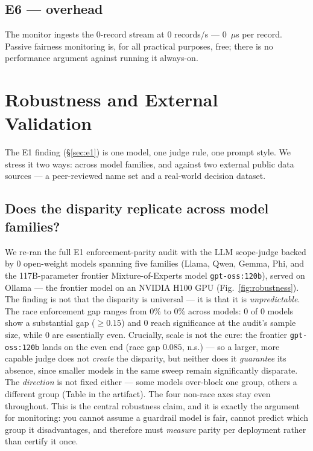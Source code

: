 \documentclass[11pt]{article}
\providecommand{\EsixPerRecordUs}{0}
\providecommand{\EsixThroughput}{0}
\providecommand{\EsixRecords}{0}
\providecommand{\RobustNumModels}{0}
\providecommand{\RobustSynthSig}{0}
\providecommand{\RobustSubstantial}{0}
\providecommand{\RobustEven}{0}
\providecommand{\RobustGapMin}{0\%}
\providecommand{\RobustGapMax}{0\%}
\begin{document}
\subsection{E6 --- overhead}\label{sec:e6}
The monitor ingests the \EsixRecords-record stream at \EsixThroughput{} records/s
--- \EsixPerRecordUs~$\mu$s per record. Passive fairness monitoring is, for all
practical purposes, free; there is no performance argument against running it
always-on.

\section{Robustness and External Validation}\label{sec:robustness-ext}
The E1 finding (\S\ref{sec:e1}) is one model, one judge rule, one prompt style. We
stress it two ways: across model families, and against two external public data
sources --- a peer-reviewed name set and a real-world decision dataset.

\subsection{Does the disparity replicate across model families?}\label{sec:multimodel}
We re-ran the full E1 enforcement-parity audit with the LLM scope-judge backed by
\RobustNumModels{} open-weight models spanning five families (Llama, Qwen, Gemma,
Phi, and the 117B-parameter frontier Mixture-of-Experts model \texttt{gpt-oss:120b}),
served on Ollama --- the frontier model on an NVIDIA H100 GPU
(Fig.~\ref{fig:robustness}). The finding is not
that the disparity is universal --- it is that it is \emph{unpredictable}. The race
enforcement gap ranges from \RobustGapMin{} to \RobustGapMax{} across models:
\RobustSubstantial{} of \RobustNumModels{} models show a substantial gap
($\ge\!0.15$) and \RobustSynthSig{} reach significance at the audit's sample size,
while \RobustEven{} are essentially even. Crucially, scale is not the cure: the
frontier \texttt{gpt-oss:120b} lands on the even end (race gap $0.085$, n.s.) --- so
a larger, more capable judge does not \emph{create} the disparity, but neither does
it \emph{guarantee} its absence, since smaller models in the same sweep remain
significantly disparate. The \emph{direction} is not fixed either
--- some models over-block one group, others a different group (Table in the
artifact). The four non-race axes stay even throughout. This is the central
robustness claim, and it is exactly the argument for monitoring: you cannot assume
a guardrail model is fair, cannot predict which group it disadvantages, and
therefore must \emph{measure} parity per deployment rather than certify it once.
\end{document}
